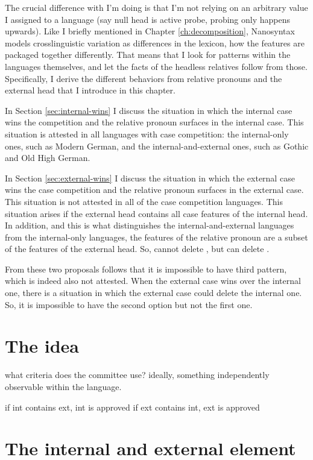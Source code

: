 The crucial difference with I'm doing is that I'm not relying on an arbitrary value I assigned to a language (say null head is active probe, probing only happens upwards). Like I briefly mentioned in Chapter \ref{ch:decomposition}, Nanosyntax models crosslinguistic variation as differences in the lexicon, how the features are packaged together differently. That means that I look for patterns within the languages themselves, and let the facts of the headless relatives follow from those. Specifically, I derive the different behaviors from relative pronouns and the external head that I introduce in this chapter.

In Section \ref{sec:internal-wins} I discuss the situation in which the internal case wins the competition and the relative pronoun surfaces in the internal case. This situation is attested in all languages with case competition: the internal-only ones, such as Modern German, and the internal-and-external ones, such as Gothic and Old High German.

In Section \ref{sec:external-wins} I discuss the situation in which the external case wins the case competition and the relative pronoun surfaces in the external case. This situation is not attested in all of the case competition languages. This situation arises if the external head contains all case features of the internal head. In addition, and this is what distinguishes the internal-and-external languages from the internal-only languages, the features of the relative pronoun are a subset of the features of the external head. So,  cannot delete , but  can delete .

From these two proposals follows that it is impossible to have third pattern, which is indeed also not attested. When the external case wins over the internal one, there is a situation in which the external case could delete the internal one. So, it is impossible to have the second option but not the first one.


\section{The idea}

what criteria does the committee use? ideally, something independently observable within the language.

if int contains ext, int is approved
if ext contains int, ext is approved


\section{The internal and external element}

